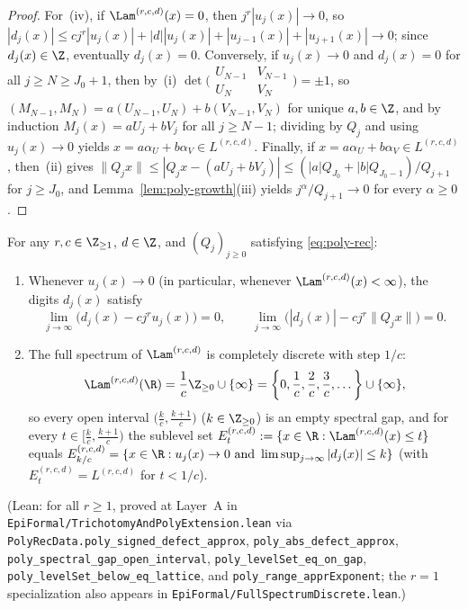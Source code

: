 \begin{proof}
For~(iv), if $\Lam^{(r,c,d)}(x)=0$, then $j^r|u_j(x)|\to0$, so
$|d_j(x)|\le cj^r|u_j(x)|+|d||u_j(x)|+|u_{j-1}(x)|+|u_{j+1}(x)|\to0$; since
$d_j(x)\in\Z$, eventually $d_j(x)=0$. Conversely, if $u_j(x)\to0$ and $d_j(x)=0$
for all $j\ge N\ge J_0+1$, then by~(i)
$\det\bigl(\begin{smallmatrix}U_{N-1}&V_{N-1}\\U_N&V_N\end{smallmatrix}\bigr)=\pm1$,
so $(M_{N-1},M_N)=a(U_{N-1},U_N)+b(V_{N-1},V_N)$ for unique $a,b\in\Z$, and by
induction $M_j(x)=aU_j+bV_j$ for all $j\ge N-1$; dividing by $Q_j$ and using
$u_j(x)\to0$ yields $x=a\alpha_U+b\alpha_V\in L^{(r,c,d)}$. Finally, if
$x=a\alpha_U+b\alpha_V\in L^{(r,c,d)}$, then~(ii) gives
$\|Q_jx\|\le|Q_jx-(aU_j+bV_j)|\le(|a|Q_{J_0}+|b|Q_{J_0-1})/Q_{j+1}$ for
$j\ge J_0$, and Lemma~\ref{lem:poly-growth}(iii) yields $j^\alpha/Q_{j+1}\to0$
for every $\alpha\ge0$.
\end{proof}

\begin{theorem}\label{thm:general-rec}
For any $r,c\in\Z_{\ge1}$, $d\in\Z$, and $(Q_j)_{j\ge0}$ satisfying
\eqref{eq:poly-rec}:
\begin{enumerate}[label=(\roman*),leftmargin=2em]
\item Whenever $u_j(x)\to0$ (in particular, whenever $\Lam^{(r,c,d)}(x)<\infty$),
the digits $d_j(x)$ satisfy
\[
\lim_{j\to\infty}\bigl(d_j(x)-cj^ru_j(x)\bigr)=0,\qquad
\lim_{j\to\infty}\bigl(|d_j(x)|-cj^r\|Q_jx\|\bigr)=0.
\]
\item The full spectrum of $\Lam^{(r,c,d)}$ is completely discrete with step $1/c$:
\[
\Lam^{(r,c,d)}(\R)=\frac{1}{c}\Z_{\ge0}\cup\{\infty\}
=\left\{0,\frac{1}{c},\frac{2}{c},\frac{3}{c},\dots\right\}\cup\{\infty\},
\]
so every open interval $\bigl(\frac{k}{c},\frac{k+1}{c}\bigr)$ ($k\in\Z_{\ge0}$)
is an empty spectral gap, and for every $t\in\bigl[\frac{k}{c},\frac{k+1}{c}\bigr)$
the sublevel set $E_t^{(r,c,d)}:=\{x\in\R:\Lam^{(r,c,d)}(x)\le t\}$ equals
$E_{k/c}^{(r,c,d)}=\{x\in\R:u_j(x)\to0\text{ and }\limsup_{j\to\infty}|d_j(x)|\le k\}$
(with $E_t^{(r,c,d)}=L^{(r,c,d)}$ for $t<1/c$).
\end{enumerate}
(Lean: for all $r\ge1$, proved at Layer~A in
\texttt{EpiFormal/\allowbreak TrichotomyAndPolyExtension.lean} via
\texttt{PolyRecData.\allowbreak poly\_\allowbreak signed\_\allowbreak defect\_\allowbreak approx},
\texttt{poly\_\allowbreak abs\_\allowbreak defect\_\allowbreak approx},
\texttt{poly\_\allowbreak spectral\_\allowbreak gap\_\allowbreak open\_\allowbreak interval},
\texttt{poly\_\allowbreak levelSet\_\allowbreak eq\_\allowbreak on\_\allowbreak gap},
\texttt{poly\_\allowbreak levelSet\_\allowbreak below\_\allowbreak eq\_\allowbreak lattice}, and
\texttt{poly\_\allowbreak range\_\allowbreak apprExponent}; the $r=1$
specialization also appears in
\texttt{EpiFormal/\allowbreak Full\allowbreak Spectrum\allowbreak Discrete.lean}.)
\end{theorem}

